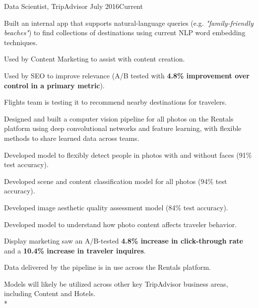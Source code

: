 \documentclass[print]{friggeri-cv} %
\begin{document}
\begin{description} \itemsep1pt \parskip0pt 
  \item {\largeheaderfont Data Scientist, TripAdvisor } \hfill
    {\smallheaderfont July 2016\textemdash Current}
    \begin{myitemize} \itemsep1pt \parskip1pt 
      \item Built an internal app that supports natural-language queries
      (e.g. \textit {"family-friendly beaches"}) to find collections of destinations
        using current NLP word embedding techniques.
      \begin{myitemize} \itemsep1pt \parskip1pt 
        \item Used by Content Marketing to assist with content creation.
        \item Used by SEO to improve relevance (A/B
          tested with \textbf{4.8\% improvement over control in a primary
          metric}).
        \item Flights team is testing it to recommend nearby destinations for
          travelers.
      \end{myitemize}
      \item Designed and built a computer vision pipeline for all photos on the
        Rentals platform using deep convolutional networks and feature
        learning, with flexible methods to share learned data across teams.
        \begin{myitemize} \itemsep1pt \parskip0pt 
          \item Developed model to flexibly detect people in photos with and
            without faces (91\% test accuracy).
          \item Developed scene and content classification model for all photos
            (94\% test accuracy).
          \item Developed image aesthetic quality assessment model (84\%
            test accuracy).
          \item Developed model to understand how photo content affects
            traveler behavior.
          \item Display marketing saw an A/B-tested
            \textbf{4.8\% increase in click-through rate} and a \textbf{10.4\%
            increase in traveler inquires}.
          \item Data delivered by the pipeline is in use across the Rentals
            platform.
          \item Models will likely be utilized across other key TripAdvisor
            business areas, including Content and Hotels.\\*
        \end{myitemize}
    \end{myitemize}

  \end{description}
\end{document}
